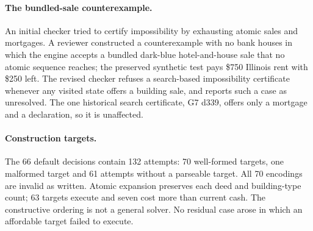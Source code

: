 \paragraph{The bundled-sale counterexample.} An initial checker tried to certify impossibility by exhausting atomic sales and mortgages. A reviewer constructed a counterexample with no bank houses in which the engine accepts a bundled dark-blue hotel-and-house sale that no atomic sequence reaches; the preserved synthetic test pays \$750 Illinois rent with \$250 left. The revised checker refuses a search-based impossibility certificate whenever any visited state offers a building sale, and reports such a case as unresolved. The one historical search certificate, G7 d339, offers only a mortgage and a declaration, so it is unaffected.

\paragraph{Construction targets.} The 66 default decisions contain 132 attempts: 70 well-formed targets, one malformed target and 61 attempts without a parseable target. All 70 encodings are invalid as written. Atomic expansion preserves each deed and building-type count; 63 targets execute and seven cost more than current cash. The constructive ordering is not a general solver. No residual case arose in which an affordable target failed to execute.

